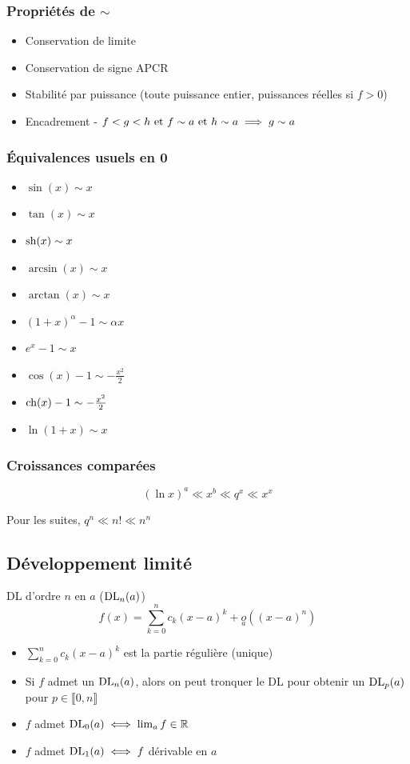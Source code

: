 \documentclass[openany]{book}
\begin{document}
\subsubsection{Propriétés de $\sim$}
\begin{itemize}
    \item Conservation de limite
    \item Conservation de signe APCR
    \item Stabilité par puissance (toute puissance entier, puissances réelles si $f > 0$)
    \item Encadrement - $f < g < h \text{ et } f \sim a \text{ et } h \sim a \implies g \sim a$
\end{itemize}

\subsubsection{Équivalences usuels en 0}
\begin{itemize}
    \item $\sin{(x)} \sim x$
    \item $\tan{(x)} \sim x$
    \item $\text{sh}{(x)} \sim x$
    \item $\arcsin{(x)} \sim x$
    \item $\arctan{(x)} \sim x$
    \item $(1+x)^\alpha - 1 \sim \alpha x$
    \item $e^{x} - 1 \sim x$
    \item $\cos{(x)}-1 \sim -\frac{x^2}{2}$
    \item $\text{ch}{(x)}-1 \sim -\frac{x^2}{2}$
    \item $\ln{(1+x)} \sim x$
\end{itemize}

\subsubsection{Croissances comparées}
\[ (\ln{x})^a \ll x^b \ll q^x \ll x^x \]

Pour les suites, $q^n \ll n! \ll n^n$

\subsection{Développement limité}
DL d'ordre $n$ en $a$ ($\text{DL}_{n}(a)$)
\[ f(x) = \sum_{k=0}^{n} c_k(x-a)^k + \underset{a}{o}((x-a)^n) \]

\begin{itemize}
    \item $\sum_{k=0}^{n} c_k(x-a)^k$ est la partie régulière (unique)
    \item Si $f$ admet un $\text{DL}_{n}(a)$, alors on peut tronquer le DL pour obtenir un $\text{DL}_{p}(a)$ pour $p \in \llbracket 0, n \rrbracket$
    \item $f$ admet $\text{DL}_{0}(a) \iff \lim_{a} f \in \mathbb{R}$
    \item $f$ admet $\text{DL}_{1}(a) \iff f$ dérivable en $a$
\end{itemize}
\end{document}
